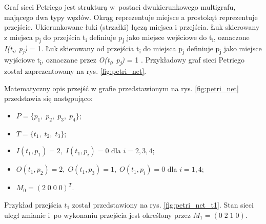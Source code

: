 \documentclass[a4paper, 12pt, twoside]{article}
\begin{document}
Graf sieci Petriego jest strukturą w~postaci dwukierunkowego multigrafu, mającego dwa typy węzłów. Okrąg reprezentuje miejsce a prostokąt reprezentuje przejście. Ukierunkowane łuki (strzałki) łączą miejsca i przejścia. Łuk skierowany z miejsca p\textsubscript{j} do przejścia t\textsubscript{i} definiuje p\textsubscript{j} jako miejsce wejściowe do t\textsubscript{i}, oznaczone \textit{I(t\textsubscript{i}, p\textsubscript{j})} = 1. Łuk skierowany od przejścia t\textsubscript{i} do miejsca p\textsubscript{j} definiuje p\textsubscript{j} jako miejsce wyjściowe t\textsubscript{i}, oznaczane przez \textit{O(t\textsubscript{i}, p\textsubscript{j})} = 1 \cite{petriIntro}. Przykładowy graf sieci Petriego został zaprezentowany na rys. \ref{fig:petri_net}.


Matematyczny opis przejść w grafie przedstawionym na rys. \ref{fig:petri_net} przedstawia się następująco:
\begin{itemize}[label={}, leftmargin=10.0mm]
   \item \( P = \{p_1, \; p_2,\;  p_3,\;  p_4\}\);
   \item \( T = \{t_1,\; t_2,\; t_3\} \);
   \item \( I(t_1, p_1) = 2, \;I(t_1, p_i) = 0 \) dla \( i = 2, 3, 4 \);
   \item \( O(t_1, p_2) = 2, \;O(t_1, p_3) = 1,\; O(t_1, p_i) = 0 \) dla \( i = 1, 4\);
   \item \( M_0 = (2\;0\;0\;0)^T \).
\end{itemize}

Przykład przejścia \(t_1\) został przedstawiony na rys. \ref{fig:petri_net_t1}. Stan sieci uległ zmianie i~po wykonaniu przejścia jest określony przez \(M_1 = (0\;2\;1\;0) \).

\end{document}
